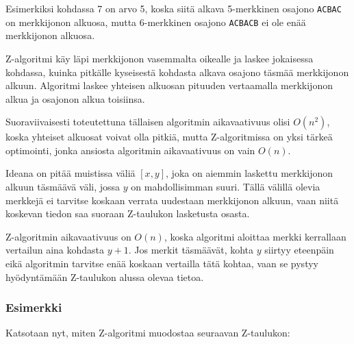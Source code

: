 Esimerkiksi kohdassa 7 on arvo 5,
koska siitä alkava 5-merkkinen osajono
\texttt{ACBAC} on merkkijonon alkuosa,
mutta 6-merkkinen osajono \texttt{ACBACB}
ei ole enää merkkijonon alkuosa.

Z-algoritmi käy läpi merkkijonon
vasemmalta oikealle ja laskee
jokaisessa kohdassa,
kuinka pitkälle kyseisestä kohdasta alkava
osajono täsmää merkkijonon alkuun.
Algoritmi laskee yhteisen
alkuosan pituuden vertaamalla
merkkijonon alkua ja osajonon alkua toisiinsa.

Suoraviivaisesti toteutettuna
tällaisen algoritmin aikavaativuus olisi $O(n^2)$,
koska yhteiset alkuosat voivat olla pitkiä,
mutta Z-algoritmissa on yksi tärkeä
optimointi, jonka ansiosta algoritmin
aikavaativuus on vain $O(n)$.

Ideana on pitää muistissa väliä $[x,y]$,
joka on aiemmin laskettu merkkijonon
alkuun täsmäävä väli, jossa $y$ on 
mahdollisimman suuri.
Tällä välillä olevia
merkkejä ei tarvitse koskaan
verrata uudestaan
merkkijonon alkuun, vaan niitä koskevan
tiedon saa suoraan Z-taulukon lasketusta osasta.

Z-algoritmin aikavaativuus on $O(n)$,
koska algoritmi aloittaa merkki kerrallaan
vertailun aina kohdasta $y+1$.
Jos merkit täsmäävät, kohta $y$
siirtyy eteenpäin
eikä algoritmin tarvitse enää
koskaan vertailla tätä kohtaa,
vaan se pystyy hyödyntämään
Z-taulukon alussa olevaa tietoa.

\subsubsection*{Esimerkki}

Katsotaan nyt, miten Z-algoritmi muodostaa
seuraavan Z-taulukon:

